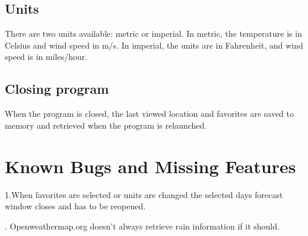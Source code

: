 \documentclass[a4paper,10pt]{article}
\begin{document}
\subsection{Units}

There are two units available: metric or imperial. In metric, the temperature is in Celsius and wind speed in m/s. In imperial, the units are in Fahrenheit, and wind speed is in miles/hour.

\subsection{Closing program}

When the program is closed, the last viewed location and favorites are saved to memory and retrieved when the program is relaunched.


\section{Known Bugs and Missing Features}

1.When favorites are selected or units are changed the selected days forecast window closes and has to be reopened.

. Openweathermap.org doesn't always retrieve rain information if it should.
\end{document}
